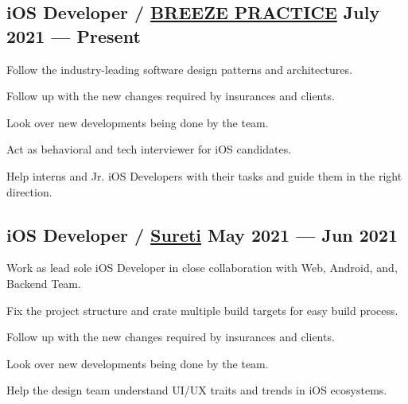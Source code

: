\documentclass[letter,10pt]{article}
\begin{document}
\subsection{{iOS Developer / \href{https://www.carecloud.com/breeze/}{BREEZE PRACTICE} \hfill July 2021 --- Present}}
\begin{zitemize}
\item Follow the industry-leading software design patterns and architectures.
\item Follow up with the new changes required by insurances and clients.
\item Look over new developments being done by the team.
\item Act as behavioral and tech interviewer for iOS candidates.
\item Help interns and Jr. iOS Developers with their tasks and guide them in the right direction.
\end{zitemize}

\subsection{{iOS Developer / \href{https://sureti.com/}{Sureti} \hfill May 2021 --- Jun 2021}}
\begin{zitemize}
\item Work as lead sole iOS Developer in close collaboration with Web, Android, and, Backend Team.
\item Fix the project structure and crate multiple build targets for easy build process.
\item Follow up with the new changes required by insurances and clients.
\item Look over new developments being done by the team.
\item Help the design team understand UI/UX traits and trends in iOS ecosystems.
\end{zitemize}

\end{document}
